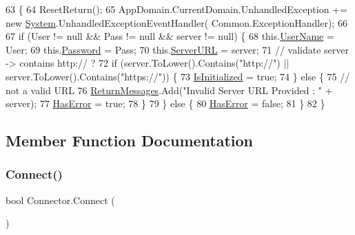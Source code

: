 \begin{DoxyCode}
63                                                               \{
64         ResetReturn();
65         AppDomain.CurrentDomain.UnhandledException += \textcolor{keyword}{new} \mbox{\hyperlink{namespace_system}{System}}.UnhandledExceptionEventHandler(
      Common.ExceptionHandler);
66 
67         \textcolor{keywordflow}{if} (User != null && Pass != null && server != null) \{
68             this.\mbox{\hyperlink{class_connector_a41d247f09774f0ed206ce1a4a2463fed}{UserName}} = User;
69             this.\mbox{\hyperlink{class_connector_a7dd469898462ef761d256392766461fe}{Password}} = Pass;
70             this.\mbox{\hyperlink{class_connector_ac0cae400459978dde8030f75208e48f1}{ServerURL}} = server;
71             \textcolor{comment}{// validate server -> contains http:// ?}
72             \textcolor{keywordflow}{if} (server.ToLower().Contains(\textcolor{stringliteral}{"http://"}) || server.ToLower().Contains(\textcolor{stringliteral}{"https://"})) \{
73                 \mbox{\hyperlink{class_connector_ae9cbe0b51d601dab13ba7271db4f3883}{IsInitialized}} = \textcolor{keyword}{true};
74             \} \textcolor{keywordflow}{else} \{
75                 \textcolor{comment}{// not a valid URL}
76                 \mbox{\hyperlink{class_connector_a1ed422674b344524fd77998dcf6a9ba6}{ReturnMessages}}.Add(\textcolor{stringliteral}{"Invalid Server URL Provided : "} + server);
77                 \mbox{\hyperlink{class_connector_a9365777a6b7b711b75bcfa6c4d53e989}{HasError}} = \textcolor{keyword}{true};
78             \}
79         \} \textcolor{keywordflow}{else} \{
80             \mbox{\hyperlink{class_connector_a9365777a6b7b711b75bcfa6c4d53e989}{HasError}} = \textcolor{keyword}{false};
81         \}
82     \}
\end{DoxyCode}


\subsection{Member Function Documentation}
\mbox{\label{class_connector_a0dcf8f969c37c4306c567417a872329a}} 
\subsubsection{\texorpdfstring{Connect()}{Connect()}}
{\footnotesize\ttfamily bool Connector.\+Connect (\begin{DoxyParamCaption}{ }\end{DoxyParamCaption})}



